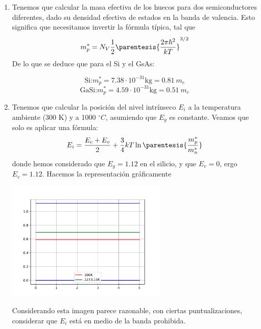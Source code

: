 
	\begin{enumerate}[label=\alph*)]
		\item	Tenemos que calcular la masa efectiva de los huecos para dos semiconductores diferentes, dado su densidad efectiva de estados en la banda de valencia. Esto significa que necesitamos invertir la fórmula típica, tal que
		\begin{equation}
			m_p^* = N_V  \frac{1}{2} \parentesis{\frac{2 \pi \hbar^2}{kT}}^{3/2}
		\end{equation}
		De lo que se deduce que para el Si y el GsAs:

		\begin{equation}
			\text{Si:} m_p^* = 7.38\cdot10^{-31} \text{kg} = 0.81 \ {m}_e
		\end{equation}
		\begin{equation}
			\text{GaSi:}m_p^* = 4.59 \cdot10^{-31} \text{kg} = 0.51 \ {m}_e
		\end{equation}
		\item Tenemos que calcular la posición del nivel intrínseco $E_i$ a la temperatura ambiente (300 K) y a 1000 $^\circ C$, asumiendo que $E_g$ es constante. Veamos que solo es aplicar una fórmula:
		\begin{equation}
			E_i = \frac{E_c+E_v}{2} + \frac{3}{4} kT \ln\parentesis{\frac{m_p^*}{m_n^*}}
		\end{equation}
		donde hemos considerado que $E_g=1.12$ en el silicio, y que $E_v=0$, ergo $E_c=1.12$. Hacemos la representación gráficamente
		\begin{center}
			\includegraphics[width=0.6\textwidth]{Cuerpo/Ch_01/Ejercicio_01_5.pdf}
		\end{center}
		Considerando esta imagen parece razonable, con ciertas puntualizaciones, considerar que $E_i$ está en medio de la banda prohibida.
	\end{enumerate}
	
